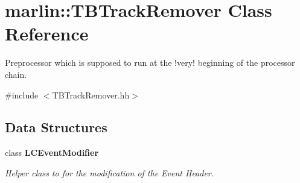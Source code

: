 \section{marlin::TBTrackRemover Class Reference}
\label{classmarlin_1_1TBTrackRemover}


Preprocessor which is supposed to run at the !very! beginning of the processor chain.  


{\ttfamily \#include $<$TBTrackRemover.hh$>$}\subsection*{Data Structures}
\begin{DoxyCompactItemize}
\item 
class {\bf LCEventModifier}
\begin{DoxyCompactList}\small\item\em Helper class to for the modification of the Event Header. \item\end{DoxyCompactList}\end{DoxyCompactItemize}
